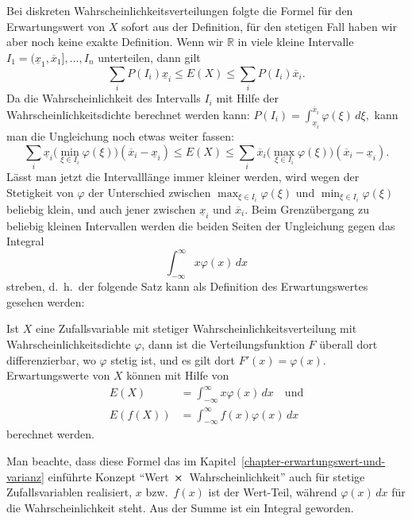 Bei diskreten Wahrscheinlichkeitsverteilungen folgte die Formel für den
Erwartungswert von $X$ sofort aus der Definition, für den stetigen
Fall haben wir aber noch keine exakte Definition.
Wenn wir $\mathbb{R}$
in viele kleine Intervalle $I_1=(\underline x_1,\overline x_1],\dots, I_n$
unterteilen, dann gilt
\[
\sum_{i}P(I_i)\underline x_i\le
E(X)
\le
\sum_{i}P(I_i)\overline x_i.
\]
Da die Wahrscheinlichkeit des Intervalls $I_i$ mit Hilfe der
Wahrscheinlichkeitsdichte berechnet werden kann:
$P(I_i)=\int_{\underline x_i}^{\overline x_i}\varphi(\xi)\,d\xi,$
kann man die Ungleichung noch etwas weiter fassen:
\[
\sum_{i}\underline x_i\bigl(\min_{\xi\in I_i}\varphi(\xi)\bigr)(\overline x_i-\underline x_i)\le
E(X)
\le
\sum_{i}\overline x_i\bigl(\max_{\xi\in I_i}\varphi(\xi)\bigr)(\overline x_i-\underline x_i).
\]
Lässt man jetzt die Intervalllänge immer kleiner werden, wird wegen der
Stetigkeit von $\varphi$ der Unterschied zwischen
$\max_{\xi\in I_i}\varphi(\xi)$ und
$\min_{\xi\in I_i}\varphi(\xi)$ beliebig klein, und auch jener
zwischen $\underline x_i$ und $\overline x_i$.
Beim Grenzübergang
zu beliebig kleinen Intervallen werden die beiden Seiten der Ungleichung
gegen das Integral
\[
\int_{-\infty}^{\infty}x\varphi(x)\,dx
\]
streben, d.~h.~der folgende Satz kann als Definition des Erwartungswertes
gesehen werden:
\begin{satz}
Ist $X$ eine Zufallsvariable mit stetiger
Wahrscheinlichkeitsverteilung mit Wahrscheinlichkeitsdichte
$\varphi$, dann
ist die Verteilungsfunktion $F$ überall dort differenzierbar, wo
$\varphi$ stetig ist, und es gilt dort
$F'(x)=\varphi(x)$.
Erwartungswerte von $X$ können mit Hilfe von
\begin{align*}
E(X)&=\int_{-\infty}^{\infty}x\varphi(x)\,dx\quad\text{und}\\
E(f(X))&=\int_{-\infty}^{\infty}f(x)\varphi(x)\,dx
\end{align*}
berechnet werden.
\end{satz}

Man beachte, dass diese Formel das im
Kapitel~\ref{chapter-erwartungswert-und-varianz} einführte Konzept
``Wert $\mathstrut \times\mathstrut $ Wahrscheinlichkeit''
auch für stetige Zufallsvariablen realisiert, $x$ bzw.~$f(x)$ ist
der Wert-Teil, während $\varphi(x)\,dx$ für die Wahrscheinlichkeit
steht.
Aus der Summe ist ein Integral geworden.

